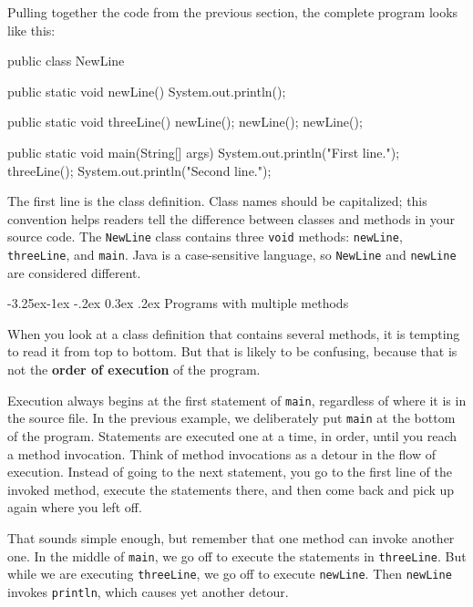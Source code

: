 \documentclass[12pt]{book}
\makeatletter
\theoremstyle{exercise}
\newcommand{\java}[1]{\verb"#1"}
\renewcommand\subsection{\@startsection{subsection}{2}{\z@}%
    {-3.25ex\@plus -1ex \@minus -.2ex}%
    {0.3ex \@plus .2ex}%
    {\normalfont\large\bfseries}}
\newcommand{\java}[1]{\lstinline{#1}} %
\makeatother
\begin{document}
Pulling together the code from the previous section, the complete program looks like this:

\begin{code}
public class NewLine {

    public static void newLine() {
        System.out.println();
    }

    public static void threeLine() {
        newLine();
        newLine();
        newLine();
    }

    public static void main(String[] args) {
        System.out.println("First line.");
        threeLine();
        System.out.println("Second line.");
    }
}
\end{code}


The first line is the class definition.
Class names should be capitalized; this convention helps readers tell the difference between classes and methods in your source code.
The \java{NewLine} class contains three \java{void} methods: \java{newLine}, \java{threeLine}, and \java{main}.
Java is a case-sensitive language, so \java{NewLine} and \java{newLine} are considered different.

\subsection{Programs with multiple methods}


When you look at a class definition that contains several methods, it is tempting to read it from top to bottom.
But that is likely to be confusing, because that is not the {\bf order of execution} of the program.

Execution always begins at the first statement of \java{main}, regardless of where it is in the source file.
In the previous example, we deliberately put \java{main} at the bottom of the program.
Statements are executed one at a time, in order, until you reach a method invocation.
Think of method invocations as a detour in the flow of execution.
Instead of going to the next statement, you go to the first line of the invoked method, execute the statements there, and then come back and pick up again where you left off.

That sounds simple enough, but remember that one method can invoke another one.
In the middle of \java{main}, we go off to execute the statements in \java{threeLine}.
But while we are executing \java{threeLine}, we go off to execute \java{newLine}.
Then \java{newLine} invokes \java{println}, which causes yet another detour.
\end{document}
